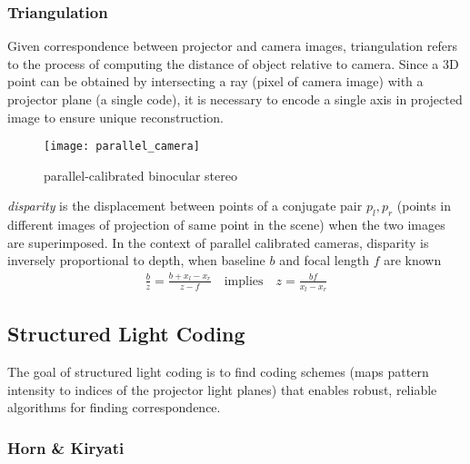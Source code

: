 \documentclass[../writeup.tex]{subfiles}
\begin{document}
\subsubsection{Triangulation}

Given correspondence between projector and camera images, triangulation refers to the process of computing the distance of object relative to camera. Since a 3D point can be obtained by intersecting a ray (pixel of camera image) with a projector plane (a single code), it is necessary to encode a single axis in projected image to ensure unique reconstruction. 
\begin{figure}[h!]
    \begin{center}
        \texttt{[image: parallel\_camera]}
        \caption{parallel-calibrated binocular stereo}
    \end{center}
\end{figure}
\noindent \textit{disparity} is the displacement between points of a conjugate pair $p_l,p_r$ (points in different images of projection of same point in the scene) when the two images are superimposed. In the context of parallel calibrated cameras, disparity is inversely proportional to depth, when baseline $b$ and focal length $f$ are known
\begin{align*}
    \frac{b}{z} = \frac{b + x_l - x_r}{z-f}
    \quad\text{implies}\quad
    z = \frac{bf}{x_l-x_r}
\end{align*}

\subsection{Structured Light Coding}

The goal of structured light coding is to find coding schemes (maps pattern intensity to indices of the projector light planes) that enables robust, reliable algorithms for finding correspondence.


\subsubsection{Horn \& Kiryati} 
\end{document}
